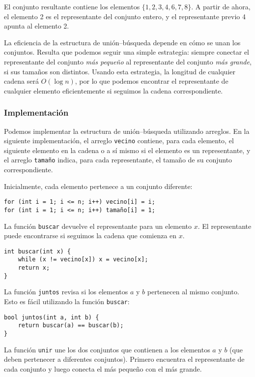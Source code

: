 El conjunto resultante contiene los elementos $\{1,2,3,4,6,7,8\}$.
A partir de ahora, el elemento 2 es el representante del conjunto
entero, y el representante previo 4 apunta al elemento 2.

La eficiencia de la estructura de unión--búsqueda depende en cómo
se unan los conjuntos. Resulta que podemos seguir una simple estrategia:
siempre conectar el representante del conjunto \emph{más pequeño} al
representante del conjunto \emph{más grande}, si sus tamaños son distintos.
Usando esta estrategia, la longitud de cualquier cadena será $O(\log n)$,
por lo que podemos encontrar el representante de cualquier elemento
eficientemente si seguimos la cadena correspondiente.

\subsubsection{Implementación}

Podemos implementar la estructura de unión--búsqueda utilizando arreglos.
En la siguiente implementación, el arreglo \texttt{vecino} contiene, para
cada elemento, el siguiente elemento en la cadena o a sí mismo si el
elemento es un representante, y el arreglo \texttt{tamaño} indica, para
cada representante, el tamaño de su conjunto correspondiente.

Inicialmente, cada elemento pertenece a un conjunto diferente:
\begin{lstlisting}
for (int i = 1; i <= n; i++) vecino[i] = i;
for (int i = 1; i <= n; i++) tamaño[i] = 1;
\end{lstlisting}

La función \texttt{buscar} devuelve el representante para un elemento
$x$. El representante puede encontrarse si seguimos la cadena que
comienza en $x$.

\begin{lstlisting}
int buscar(int x) {
    while (x != vecino[x]) x = vecino[x];
    return x;
}
\end{lstlisting}

\newpage
La función \texttt{juntos} revisa si los elementos $a$ y $b$ pertenecen
al mismo conjunto. Esto es fácil utilizando la función \texttt{buscar}:

\begin{lstlisting}
bool juntos(int a, int b) {
    return buscar(a) == buscar(b);
}
\end{lstlisting}

La función \texttt{unir} une los dos conjuntos que contienen a los
elementos $a$ y $b$ (que deben pertenecer a diferentes conjuntos).
Primero encuentra el representante de cada conjunto
y luego conecta el más pequeño con el más grande.


